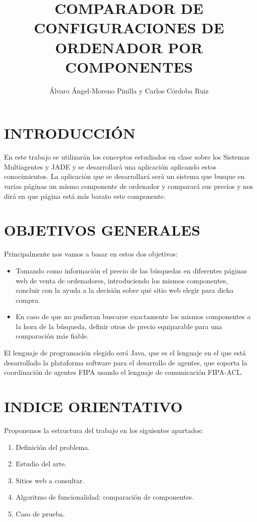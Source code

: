 \documentclass{pre-tfg}
\title{COMPARADOR DE CONFIGURACIONES DE ORDENADOR POR COMPONENTES}
\author{Álvaro Ángel-Moreno Pinilla y Carlos Córdoba Ruiz}
\begin{document}
\maketitle
\tableofcontents

\newpage

\section{INTRODUCCIÓN}

En este trabajo se utilizarán los conceptos estudiados en clase sobre los Sistemas Multiagentes y JADE y se desarrollará una aplicación aplicando estos conocimientos. La aplicación que se desarrollará será un sistema que busque en varias páginas un mismo componente de ordenador y comparará sus precios y nos dirá en que página está más barato este componente.



\section{OBJETIVOS GENERALES}
Principalmente nos vamos a basar en estos dos objetivos:
\begin{itemize}
	\item Tomando como información el precio de las búsquedas en diferentes páginas web de venta de ordenadores, introduciendo los mismos componentes, concluir con la ayuda a la decisión sobre qué sitio web elegir para dicha compra.
	\item En caso de que no pudieran buscarse exactamente los mismos componentes a la hora de la búsqueda, definir otros de precio equiparable para una comparación más fiable.
\end{itemize}
El lenguaje de programación elegido será Java, que es el lenguaje en el que está desarrollado la plataforma software para el desarrollo de agentes, que soporta la coordinación de agentes FIPA usando el lenguaje de comunicación FIPA-ACL.




\section{INDICE ORIENTATIVO}
 Proponemos la estructura del trabajo en los siguientes apartados:
 \begin{enumerate}
 	\item Definición del problema.	
 	\item Estudio del arte.
 	\item Sitios web a consultar.
 	\item Algoritmo de funcionalidad: comparación de componentes.
 	\item Caso de prueba.
 \end{enumerate}
\end{document}
